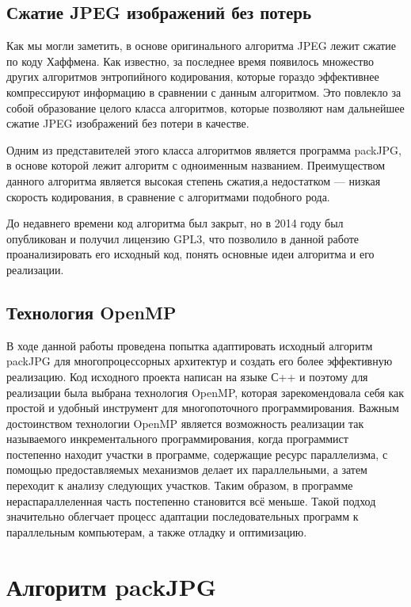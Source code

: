 \documentclass{matmex-diploma-custom}
\begin{document}

\subsection{Сжатие JPEG изображений без потерь}
Как мы могли заметить, в основе оригинального алгоритма JPEG лежит сжатие по коду Хаффмена. Как известно, за последнее время появилось множество других алгоритмов энтропийного кодирования, которые гораздо эффективнее компрессируют информацию в сравнении с данным алгоритмом. Это повлекло за собой образование целого класса алгоритмов, которые позволяют нам дальнейшее сжатие JPEG изображений без  потери в качестве.

    Одним из представителей этого класса алгоритмов является программа packJPG, в основе которой лежит алгоритм с одноименным названием. Преимуществом данного алгоритма является высокая степень сжатия,а недостатком  --- низкая скорость кодирования, в сравнение с алгоритмами подобного рода.

    До недавнего времени код алгоритма был закрыт, но в 2014 году был опубликован и получил лицензию GPL3, что позволило в данной работе проанализировать его исходный код, понять основные идеи алгоритма и его реализации.


\subsection{Технология OpenMP}
В ходе данной работы  проведена попытка адаптировать исходный алгоритм packJPG для многопроцессорных архитектур и создать его более эффективную реализацию. Код исходного проекта написан на языке С++ и поэтому для реализации была выбрана технология OpenMP, которая зарекомендовала себя как простой и удобный инструмент для многопоточного программирования.
    Важным достоинством технологии OpenMP является возможность реализации так называемого инкрементального программирования, когда программист постепенно находит участки в программе, содержащие ресурс параллелизма, с помощью предоставляемых механизмов делает их параллельными, а затем переходит к анализу следующих участков. Таким образом, в программе нераспараллеленная часть постепенно становится всё меньше. Такой подход значительно облегчает процесс адаптации последовательных программ к параллельным компьютерам, а также отладку и оптимизацию.

\section{Алгоритм packJPG}
\end{document}
